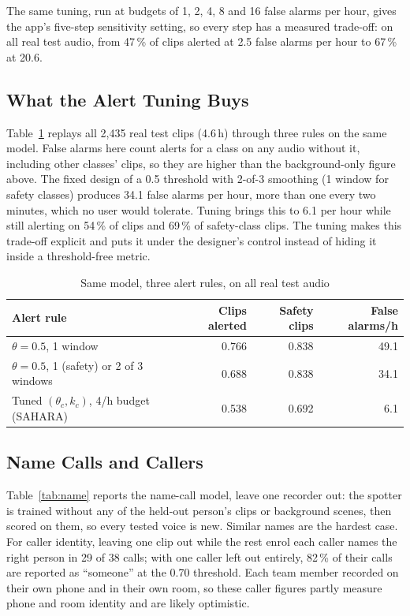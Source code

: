 \documentclass{svproc}
\begin{document}
The same tuning, run at budgets of 1, 2, 4, 8 and 16 false alarms per hour, gives the app's five-step sensitivity setting, so every step has a measured trade-off: on all real test audio, from 47\,\% of clips alerted at 2.5 false alarms per hour to 67\,\% at 20.6.

\subsection{What the Alert Tuning Buys}
Table~\ref{tab:ablation} replays all 2,435 real test clips (4.6\,h) through three rules on the same model. False alarms here count alerts for a class on any audio without it, including other classes' clips, so they are higher than the background-only figure above. The fixed design of a 0.5 threshold with 2-of-3 smoothing (1 window for safety classes) produces 34.1 false alarms per hour, more than one every two minutes, which no user would tolerate. Tuning brings this to 6.1 per hour while still alerting on 54\,\% of clips and 69\,\% of safety-class clips. The tuning makes this trade-off explicit and puts it under the designer's control instead of hiding it inside a threshold-free metric.

\begin{table}[t]
\caption{Same model, three alert rules, on all real test audio}
\label{tab:ablation}
\centering
\begin{tabular}{@{}lrrr@{}}
\toprule
Alert rule & Clips alerted & Safety clips & False alarms/h \\
\midrule
$\theta=0.5$, 1 window & 0.766 & 0.838 & 49.1 \\
$\theta=0.5$, 1 (safety) or 2 of 3 windows & 0.688 & 0.838 & 34.1 \\
Tuned $(\theta_c,k_c)$, 4/h budget (SAHARA) & 0.538 & 0.692 & 6.1 \\
\bottomrule
\end{tabular}
\end{table}

\subsection{Name Calls and Callers}
Table~\ref{tab:name} reports the name-call model, leave one recorder out: the spotter is trained without any of the held-out person's clips or background scenes, then scored on them, so every tested voice is new. Similar names are the hardest case. For caller identity, leaving one clip out while the rest enrol each caller names the right person in 29 of 38 calls; with one caller left out entirely, 82\,\% of their calls are reported as ``someone'' at the 0.70 threshold. Each team member recorded on their own phone and in their own room, so these caller figures partly measure phone and room identity and are likely optimistic.
\end{document}
